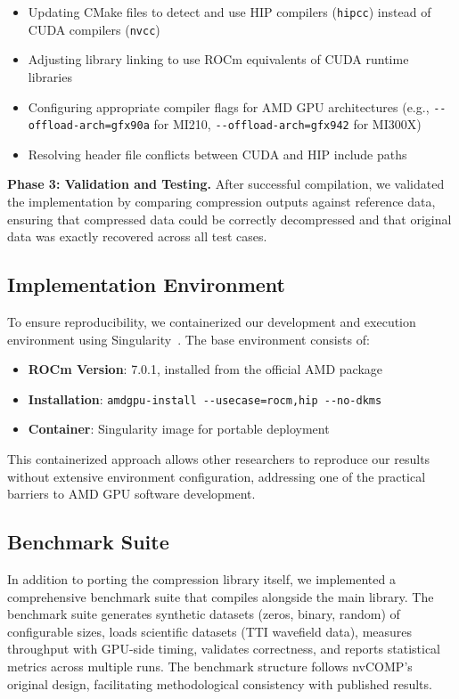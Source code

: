 \documentclass[runningheads]{llncs}
\begin{document}
\begin{itemize}
    \item Updating CMake files to detect and use HIP compilers (\texttt{hipcc}) instead of CUDA compilers (\texttt{nvcc})
    \item Adjusting library linking to use ROCm equivalents of CUDA runtime libraries
    \item Configuring appropriate compiler flags for AMD GPU architectures (e.g., \texttt{-{}-offload-arch=gfx90a} for MI210, \texttt{-{}-offload-arch=gfx942} for MI300X)
    \item Resolving header file conflicts between CUDA and HIP include paths
\end{itemize}

\textbf{Phase 3: Validation and Testing.} After successful compilation, we validated the implementation by comparing compression outputs against reference data, ensuring that compressed data could be correctly decompressed and that original data was exactly recovered across all test cases.

\subsection{Implementation Environment}

To ensure reproducibility, we containerized our development and execution environment using Singularity~\cite{singularity}. The base environment consists of:

\begin{itemize}
    \item \textbf{ROCm Version}: 7.0.1, installed from the official AMD package
    \item \textbf{Installation}: \texttt{amdgpu-install -{}-usecase=rocm,hip -{}-no-dkms}
    \item \textbf{Container}: Singularity image for portable deployment
\end{itemize}

This containerized approach allows other researchers to reproduce our results without extensive environment configuration, addressing one of the practical barriers to AMD GPU software development.

\subsection{Benchmark Suite}

In addition to porting the compression library itself, we implemented a comprehensive benchmark suite that compiles alongside the main library. The benchmark suite generates synthetic datasets (zeros, binary, random) of configurable sizes, loads scientific datasets (TTI wavefield data), measures throughput with GPU-side timing, validates correctness, and reports statistical metrics across multiple runs. The benchmark structure follows nvCOMP's original design, facilitating methodological consistency with published results.
\end{document}
